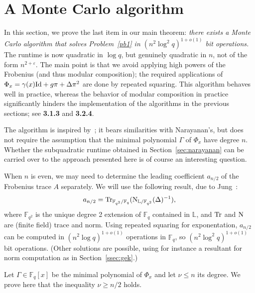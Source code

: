 \documentclass[sigconf]{acmart}
\newcommand{\F}{\mathbb{F}}
\renewcommand{\L}{\mathbb{L}}
\begin{document}

\section{A Monte Carlo algorithm}\label{sec:mc}

In this section, we prove the last item in our main theorem: {\em
  there exists a Monte Carlo algorithm that solves Problem~\ref{pb1}
  in $(n^2 \log^2 q)^{1+o(1)}$ bit operations.} The runtime is now
quadratic in $\log q$, but genuinely quadratic in $n$, not of the form
$n^{2+\varepsilon}$. The main point is that we avoid applying high
powers of the Frobenius (and thus modular composition); the required
applications of $\Phi_x= \gamma(x){\rm Id} + g \pi + \Delta \pi^2$ are
done by repeated squaring.  This algorithm behaves well in practice,
whereas the behavior of modular composition in practice significantly
hinders the implementation of the algorithms in the previous sections;
see {\bf 3.1.3} and {\bf 3.2.4}.

The algorithm is inspired by~\cite[Th.~5]{Shoup94}; it bears
similarities with Narayanan's, but does not require the assumption
that the minimal polynomial $\Gamma$ of $\Phi_x$ have degree
$n$. Whether the subquadratic runtime obtained in
Section~\ref{sec:narayanan} can be carried over to the approach
presented here is of course an interesting question.

\smallskip{} When $n$ is even, we may need to
determine the leading coefficient $a_{n/2}$ of the Frobenius trace $A$
separately. We will use the following result, due to
Jung~\cite{Jung00,frobdist}:
\[a_{n/2} = {\rm Tr}_{\F_{q^2}/\F_{q}}({\rm N}_{\L/\F_{q^2}}(\Delta)^{-1}),\]
where $\F_{q^2}$ is the unique degree 2 extension of $\F_q$ contained
in $\L$, and ${\rm Tr}$ and ${\rm N}$ are (finite field) trace and
norm. Using repeated squaring for exponentation, $a_{n/2}$ can be
computed in $(n^2 \log q)^{1+o(1)}$ operations in $\F_q$, so $(n^2
  \log^2 q)^{1+o(1)}$ bit operations.
(Other solutions are possible, using for instance a resultant
 for norm computation as in Section~\ref{ssec:gek}.)

\smallskip{} Let $\Gamma \in \F_q[x]$ be the minimal
polynomial of $\Phi_x$ and let $\nu \le n$ its degree. We prove here 
that the inequality $\nu\ge n/2$ holds.
\end{document}
